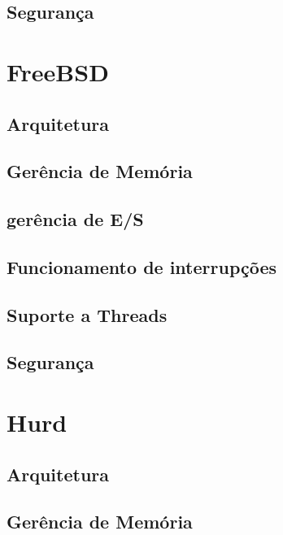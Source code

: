 \documentclass[conference]{IEEEtran}
\begin{document}
\subsection{Segurança}\label{sec:LinuxSec}

\section{FreeBSD}\label{sec:BSD}

\subsection{Arquitetura}\label{sec:BSDArq}

\subsection{Gerência de Memória}\label{sec:BSDMem}

\subsection{gerência de E/S}\label{sec:BSDES}

\subsection{Funcionamento de interrupções}\label{sec:BSDInt}

\subsection{Suporte a Threads}\label{sec:BSDThreads}

\subsection{Segurança}\label{sec:BSDSec}

\section{Hurd}\label{sec:Hurd}

\subsection{Arquitetura}\label{sec:HurdArq}

\subsection{Gerência de Memória}\label{sec:HurdMem}
\end{document}
